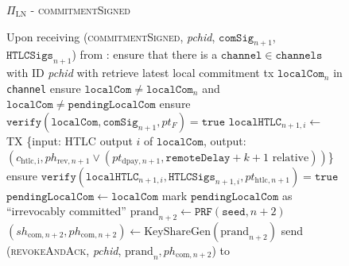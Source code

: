 \begin{figure}[!htbp]
  \begin{protocolbox}{$\Pi_{\mathrm{LN}}$ - \textsc{commitmentSigned}}
    \begin{algorithmic}[1]
      \State Upon receiving (\textsc{commitmentSigned}, \textit{pchid},
      $\mathtt{comSig}_{n+1}$, $\mathtt{HTLCSigs}_{n+1}$) from \bob:
      \Indent
        \State ensure that there is a $\mathtt{channel} \in \mathtt{channels}$
        with ID \textit{pchid} with \bob
        \State retrieve latest local commitment tx $\mathtt{localCom}_n$ in
        \texttt{channel}
        \State ensure $\mathtt{localCom} \neq \mathtt{localCom}_n$ and
        $\mathtt{localCom} \neq \mathtt{pendingLocalCom}$
        \State ensure $\mathtt{verify}\left(\mathtt{localCom},
        \mathtt{comSig}_{n+1}, pt_F\right) = \mathtt{true}$
          \State $\mathtt{localHTLC}_{n+1, i} \gets$ TX \{input: HTLC output $i$
          of $\mathtt{localCom}$, output: $\left(c_{\mathrm{htlc, i}},
          ph_{\mathrm{rev}, n+1} \vee \left(pt_{\mathrm{dpay}, n+1},
          \mathtt{remoteDelay} + k + 1 \text{ relative}\right)\right)$\}
          \State ensure $\mathtt{verify}\left(\mathtt{localHTLC}_{n+1, i},
          \mathtt{HTLCSigs}_{n+1, i}, pt_{\mathrm{htlc}, n+1}\right) =
          \mathtt{true}$
        \EndFor
        \State $\mathtt{pendingLocalCom} \gets \mathtt{localCom}$
        \State mark $\mathtt{pendingLocalCom}$ as ``irrevocably committed''
        \State $\mathrm{prand}_{n+2} \gets \texttt{PRF}\left(\mathtt{seed},
        n+2\right)$
        \State $\left(sh_{\mathrm{com}, n+2}, ph_{\mathrm{com}, n+2}\right)
        \gets \mathrm{KeyShareGen}\left(\mathrm{prand}_{n+2}\right)$
        \State send (\textsc{revokeAndAck}, \textit{pchid}, $\mathrm{prand}_n,
        ph_{\mathrm{com}, n+2}$) to \bob
      \EndIndent
    \end{algorithmic}
  \end{protocolbox}
  \caption{}
  \label{alg:protocol:pay:commitmentSigned}
\end{figure}

